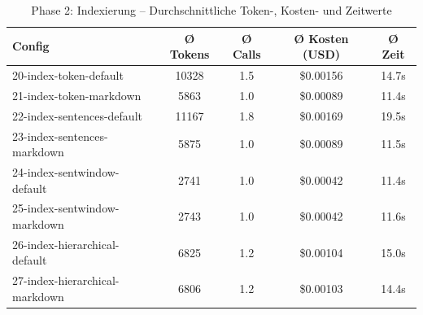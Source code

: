 \begin{table}[H]
\centering
\small
\begin{tabular}{lcccc}
\toprule
Config & Ø Tokens & Ø Calls & Ø Kosten (USD) & Ø Zeit \\
\midrule
20-index-token-default & 10328 & 1.5 & \$0.00156 & 14.7s \\
21-index-token-markdown & 5863 & 1.0 & \$0.00089 & 11.4s \\
22-index-sentences-default & 11167 & 1.8 & \$0.00169 & 19.5s \\
23-index-sentences-markdown & 5875 & 1.0 & \$0.00089 & 11.5s \\
24-index-sentwindow-default & 2741 & 1.0 & \$0.00042 & 11.4s \\
25-index-sentwindow-markdown & 2743 & 1.0 & \$0.00042 & 11.6s \\
26-index-hierarchical-default & 6825 & 1.2 & \$0.00104 & 15.0s \\
27-index-hierarchical-markdown & 6806 & 1.2 & \$0.00103 & 14.4s \\
\bottomrule
\end{tabular}
\caption{Phase 2: Indexierung -- Durchschnittliche Token-, Kosten- und Zeitwerte}
\label{tab:phase2_cost}
\end{table}